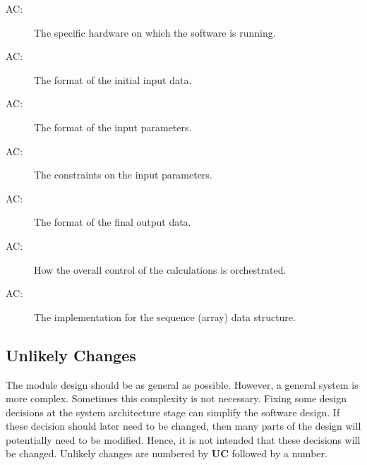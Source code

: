 \documentclass[12pt]{article}
\newcounter{acnum}
\newcommand{\actheacnum}{AC\theacnum}
\begin{document}
\begin{description}
\item[ \actheacnum \label{acHardware}:] The specific
  hardware on which the software is running.
\item[ \actheacnum \label{acInput}:] The format of the
  initial input data.
\item[ \actheacnum \label{acParams}:] The format of the
  input parameters.
\item[ \actheacnum \label{acVerify}:] The constraints on
  the input parameters.
\item[ \actheacnum \label{acOutput}:] The format of the
  final output data.
\item[ \actheacnum \label{acControl}:] How the overall
  control of the calculations is orchestrated.
\item[ \actheacnum \label{acSeqDS}:] The implementation
  for the sequence (array) data structure.
\end{description}

\subsection{Unlikely Changes} \label{SecUchange}

The module design should be as general as possible. However, a general system is
more complex. Sometimes this complexity is not necessary. Fixing some design
decisions at the system architecture stage can simplify the software design. If
these decision should later need to be changed, then many parts of the design
will potentially need to be modified. Hence, it is not intended that these
decisions will be changed.
Unlikely changes are numbered by \textbf{UC} followed by a number.
\end{document}
